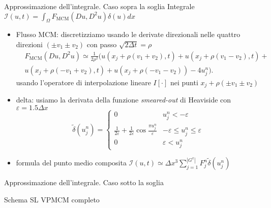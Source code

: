\begin{frame}{Approssimazione dell'integrale. Caso sopra la soglia}
  Integrale $\mathcal{I}(u,t)=\int_{\Omega}F_{\text{MCM}}(Du,D^2u)\delta(u)dx$
  \begin{itemize}
    \item \alert{Flusso MCM}: discretizziamo usando le derivate direzionali
      nelle \alert{quattro} direzioni $(\pm v_1\pm v_2)$ con passo
      $\sqrt{2\Delta t}=\rho$
      \[
      \begin{aligned}
      &F_{\text{MCM}}(Du,D^2u)\simeq\frac{1}{2\rho^2}(u(x_j+\rho(v_1+v_2),t)+u(x_j+\rho(v_1-v_2),t)+\\ 
      &u(x_j+\rho(-v_1+v_2),t)+u(x_j+\rho(-v_1-v_2))-4u_j^n).
      \end{aligned}
      \]
      usando l'operatore di interpolazione lineare $I[\cdot]$ nei
      punti $x_j+\rho(\pm v_1\pm v_2)$ 
    \item \alert{delta}: usiamo la derivata della funzione
      \emph{smeared-out} di Heaviside con $\varepsilon=1.5\Delta x$
      \[
        \tilde{\delta}(u_j^n)=
        \begin{cases}
          0  &u_j^n<-\varepsilon \\
         \frac{1}{2\varepsilon}+\frac{1}{2\varepsilon}\cos{\frac{\pi
              u_j^n}{\varepsilon}} &-\varepsilon\leq u_j^n\leq\varepsilon \\
          0  &\varepsilon< u_j^n
        \end{cases}
        \]
      \item \alert{formula del punto medio
        composita} $\mathcal{I}(u,t)\simeq\Delta x^3\sum_{j=1}^{|G^x|}F_j^n\tilde{\delta}(u_j^n)$ 
  \end{itemize}
\end{frame}

\begin{frame}{Approssimazione dell'integrale. Caso sotto la soglia}

\end{frame}

\begin{frame}{Schema SL VPMCM completo}

\end{frame}

